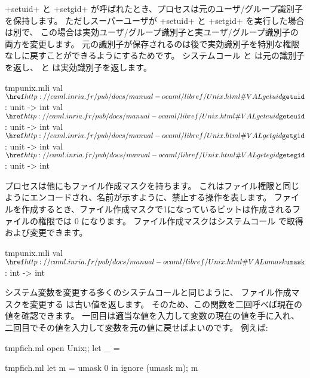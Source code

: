 \ml+setuid+ と \ml+setgid+ が呼ばれたとき、プロセスは元のユーザ/グループ識別子を保持します。
ただしスーパーユーザが \ml+setuid+ と \ml+setgid+  を実行した場合は別で、
この場合は実効ユーザ/グループ識別子と実ユーザ/グループ識別子の両方を変更します。
元の識別子が保存されるのは後で実効識別子を特別な権限なしに戻すことができるようにするためです。
システムコール  と  は元の識別子を返し、
 と  は実効識別子を返します。
%
\begin{listingcodefile}{tmpunix.mli}
val $\libvalue{Unix}{getuid}$ : unit -> int
val $\libvalue{Unix}{geteuid}$ : unit -> int
val $\libvalue{Unix}{getgid}$ : unit -> int
val $\libvalue{Unix}{getegid}$ : unit -> int
\end{listingcodefile}

プロセスは他にもファイル作成マスクを持ちます。
これはファイル権限と同じようにエンコードされ、名前が示すように、禁止する操作を表します。
ファイルを作成するとき、ファイル作成マスクで1になっているビットは作成されるファイルの権限では 0 になります。
ファイル作成マスクはシステムコール  で取得および変更できます。
%
\begin{listingcodefile}{tmpunix.mli}
val $\libvalue{Unix}{umask}$ : int -> int
\end{listingcodefile}
%
システム変数を変更する多くのシステムコールと同じように、
ファイル作成マスクを変更する  は古い値を返します。
そのため、この関数を二回呼べば現在の値を確認できます。
一回目は適当な値を入力して変数の現在の値を手に入れ、二回目でその値を入力して変数を元の値に戻せばよいのです。
例えば:
%
\begin{codefile}{tmpfich.ml}
open Unix;;
let _ =
\end{codefile}
%
\begin{listingcodefile}{tmpfich.ml}
let m = umask 0 in ignore (umask m); m
\end{listingcodefile}


